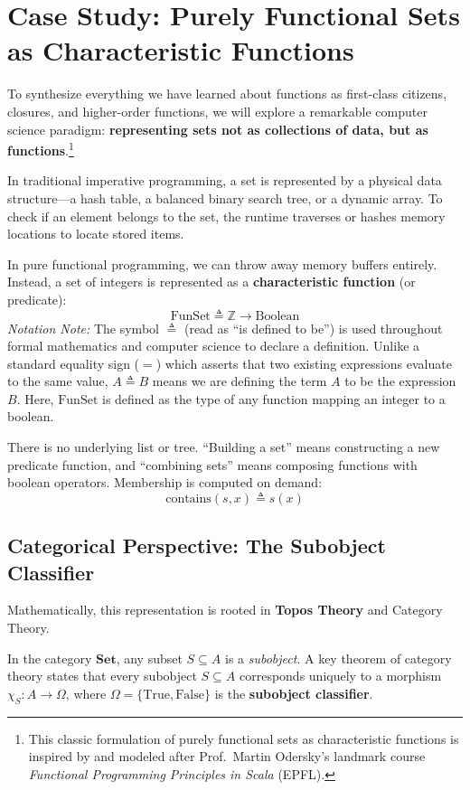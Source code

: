 \section{Case Study: Purely Functional Sets as Characteristic Functions}

To synthesize everything we have learned about functions as first-class citizens, closures, and higher-order functions, we will explore a remarkable computer science paradigm: \textbf{representing sets not as collections of data, but as functions}.\footnote{This classic formulation of purely functional sets as characteristic functions is inspired by and modeled after Prof.~Martin Odersky's landmark course \textit{Functional Programming Principles in Scala} (EPFL).}

In traditional imperative programming, a set is represented by a physical data structure---a hash table, a balanced binary search tree, or a dynamic array. To check if an element belongs to the set, the runtime traverses or hashes memory locations to locate stored items.

In pure functional programming, we can throw away memory buffers entirely. Instead, a set of integers is represented as a \textbf{characteristic function} (or predicate):
\[ \text{FunSet} \triangleq \mathbb{Z} \to \text{Boolean} \]
\textit{Notation Note:} The symbol $\triangleq$ (read as ``is defined to be'') is used throughout formal mathematics and computer science to declare a definition. Unlike a standard equality sign ($=$) which asserts that two existing expressions evaluate to the same value, $A \triangleq B$ means we are defining the term $A$ to be the expression $B$. Here, $\text{FunSet}$ is defined as the type of any function mapping an integer to a boolean.

There is no underlying list or tree. ``Building a set'' means constructing a new predicate function, and ``combining sets'' means composing functions with boolean operators. Membership is computed on demand:
\[ \text{contains}(s, x) \triangleq s(x) \]

\subsection{Categorical Perspective: The Subobject Classifier}

Mathematically, this representation is rooted in \textbf{Topos Theory} and Category Theory. 

In the category $\mathbf{Set}$, any subset $S \subseteq A$ is a \textit{subobject}. A key theorem of category theory states that every subobject $S \subseteq A$ corresponds uniquely to a morphism $\chi_S : A \to \Omega$, where $\Omega = \{\text{True}, \text{False}\}$ is the \textbf{subobject classifier}.

